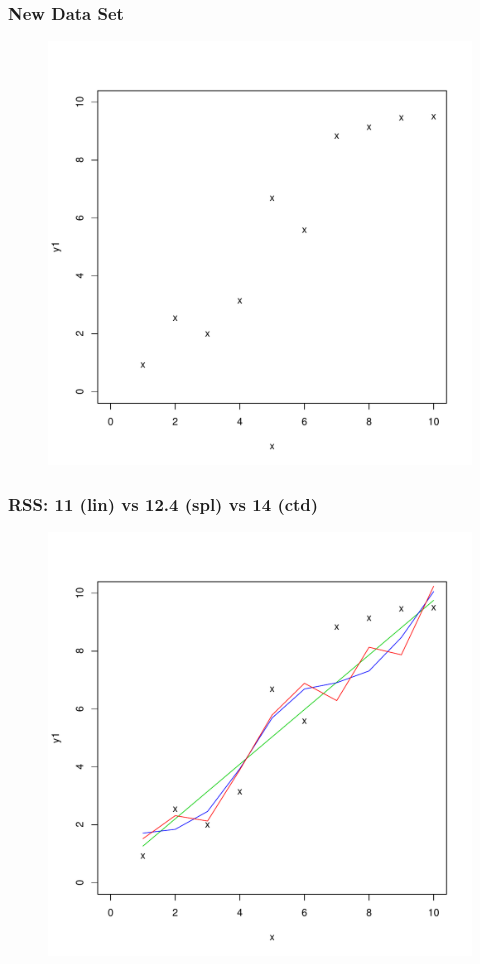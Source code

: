\documentclass[xcolor=x11names,compress]{beamer}\usepackage[]{graphicx}\usepackage[]{color}
\newenvironment{knitrout}{}{} %
\begin{document}
\begin{frame}[plain]
  \frametitle{New Data Set}
\begin{figure}
\centering
\begin{knitrout}\tiny
{}\color{fgcolor}

{\centering \includegraphics[width=.6\linewidth]{figure/beamer-unnamed-chunk-50-1} 

}



\end{knitrout}
\end{figure}
\end{frame}

\begin{frame}[plain]
  \frametitle{RSS: 11 (lin) vs 12.4 (spl) vs  14 (ctd)}
\begin{figure}
\centering
\begin{knitrout}\tiny
{}\color{fgcolor}

{\centering \includegraphics[width=.6\linewidth]{figure/beamer-unnamed-chunk-51-1} 

}



\end{knitrout}
\end{figure}
\end{frame}
\end{document}
